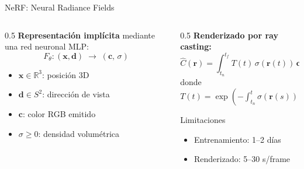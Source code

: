 \begin{frame}{NeRF: Neural Radiance Fields}
  \begin{columns}
    \begin{column}{0.5\textwidth}
      \textbf{Representación implícita} mediante una red neuronal MLP:
      \[
        F_\theta: (\mathbf{x}, \mathbf{d}) \;\to\; (\mathbf{c},\, \sigma)
      \]
      \begin{itemize}
        \item $\mathbf{x} \in \mathbb{R}^3$: posición 3D
        \item $\mathbf{d} \in S^2$: dirección de vista
        \item $\mathbf{c}$: color RGB emitido
        \item $\sigma \geq 0$: densidad volumétrica
      \end{itemize}
    \end{column}
    \begin{column}{0.5\textwidth}
      \textbf{Renderizado por ray casting:}
      \[
        \hat{C}(\mathbf{r}) = \int_{t_n}^{t_f} T(t)\,\sigma(\mathbf{r}(t))\,\mathbf{c}(\mathbf{r}(t),\mathbf{d})\,dt
      \]
      donde $T(t) = \exp\!\left(-\int_{t_n}^{t}\sigma(\mathbf{r}(s))\,ds\right)$
      \vspace{0.5em}

      \begin{alertblock}{Limitaciones}
        \begin{itemize}
          \item Entrenamiento: 1--2 días
          \item Renderizado: 5--30 s/frame
        \end{itemize}
      \end{alertblock}
    \end{column}
  \end{columns}
\end{frame}

